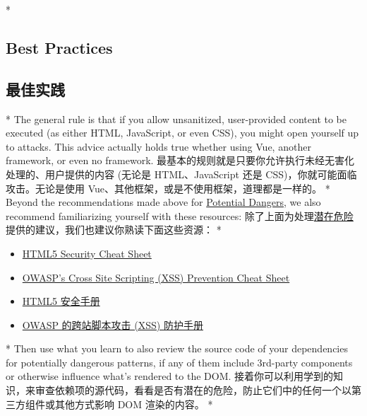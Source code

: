 \begin{paracol}{2} 
 
\switchcolumn[0]*%
\subsection{Best Practices}
\switchcolumn
\subsection{最佳实践}
\switchcolumn[0]*%
The general rule is that if you allow unsanitized, user-provided content
to be executed (as either HTML, JavaScript, or even CSS), you might open
yourself up to attacks. This advice actually holds true whether using
Vue, another framework, or even no framework.
\switchcolumn
最基本的规则就是只要你允许执行未经无害化处理的、用户提供的内容 (无论是
HTML、JavaScript 还是 CSS)，你就可能面临攻击。无论是使用
Vue、其他框架，或是不使用框架，道理都是一样的。
\switchcolumn[0]*%
Beyond the recommendations made above for
\href{https://vuejs.org/guide/best-practices/security.html\#potential-dangers}{Potential
Dangers}, we also recommend familiarizing yourself with these resources:
\switchcolumn
除了上面为处理\href{https://cn.vuejs.org/guide/best-practices/security.html\#potential-dangers}{潜在危险}提供的建议，我们也建议你熟读下面这些资源：
\switchcolumn[0]*%
\begin{itemize}
\item
  \href{https://html5sec.org/}{HTML5 Security Cheat Sheet}
\item
  \href{https://cheatsheetseries.owasp.org/cheatsheets/Cross_Site_Scripting_Prevention_Cheat_Sheet.html}{OWASP's
  Cross Site Scripting (XSS) Prevention Cheat Sheet}
\end{itemize}
\switchcolumn
\begin{itemize}
\item
  \href{https://html5sec.org/}{HTML5 安全手册}
\item
  \href{https://cheatsheetseries.owasp.org/cheatsheets/Cross_Site_Scripting_Prevention_Cheat_Sheet.html}{OWASP
  的跨站脚本攻击 (XSS) 防护手册}
\end{itemize}
\switchcolumn[0]*%
Then use what you learn to also review the source code of your
dependencies for potentially dangerous patterns, if any of them include
3rd-party components or otherwise influence what's rendered to the DOM.
\switchcolumn
接着你可以利用学到的知识，来审查依赖项的源代码，看看是否有潜在的危险，防止它们中的任何一个以第三方组件或其他方式影响
DOM 渲染的内容。
\switchcolumn[0]*%

\end{paracol}
